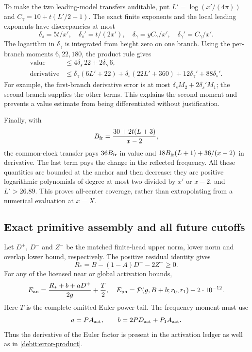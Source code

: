 \documentclass[11pt,a4paper]{article}
\theoremstyle{definition}
\theoremstyle{remark}
\begin{document}
To make the two leading-model transfers auditable, put
$L'=\log(x'/(4\pi))$ and $C_\gamma=10+t(L'/2+1)$. The exact finite
exponents and the local leading exponents have discrepancies at most
\[
 \delta_s=5t/x',\quad \delta_s'=t/(2x'),\quad
 \delta_\gamma=yC_\gamma/x',\quad
 \delta_\gamma'=C_\gamma/x'.
\]
The logarithm in $\delta_\gamma$ is integrated from height zero on one
branch. Using the per-branch moments $6,22,180$, the product rule gives
\begin{align*}
 \text{value}&\le4\delta_s\,22+2\delta_\gamma\,6,
 \\
 \text{derivative}&\le
 \delta_\gamma(6L'+22)+\delta_s(22L'+360)
       +12\delta_\gamma'+88\delta_s'.
\end{align*}
For example, the first-branch derivative error is at most
$\delta_s M_2+2\delta_s'M_1$; the second branch supplies the other
terms. This explains the second moment and prevents a value estimate
from being differentiated without justification.

Finally, with
\[
 B_{\rm fr}=\frac{30+2t(L+3)}{x-2},
\]
the common-clock transfer pays $36B_{\rm fr}$ in value and
$18B_{\rm fr}(L+1)+36/(x-2)$ in derivative. The last term pays the
change in the reflected frequency. All these quantities are bounded at
the anchor and then decrease: they are positive logarithmic polynomials
of degree at most two divided by $x'$ or $x-2$, and $L'>26.89$.
This proves all-center coverage, rather than extrapolating from a
numerical evaluation at $x=X$.

\subsection{Exact primitive assembly and all future cutoffs}

Let $D^+$, $D^-$ and $Z^-$ be the matched finite-head upper norm,
lower norm and overlap lower bound, respectively. The positive residual
identity gives
\[
 R_*=B-(1-A)D^--2Z^-\ge0.
\]
For any of the licensed near or global activation bounds,
\begin{equation}
 E_{\rm an}=\frac{R_*+b+aD^+}{2g}+\frac T2,
 \quad E_{\rm ph}=\mathcal P(g,B+b;r_0,r_1)
                         +2\cdot10^{-12}.
 \label{debit:cap-assembly}
\end{equation}
Here $T$ is the complete omitted Euler-power tail. The frequency moment
must use
\[
 a=P A_{\rm act},\qquad
 b=2P D_{\rm act}+P_1A_{\rm act}.
\]
Thus the derivative of the Euler factor is present in the activation
ledger as well as in \eqref{debit:error-product}.
\end{document}

